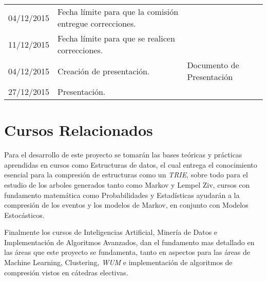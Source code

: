 \documentclass{udparticle}
\begin{document}
\begin{center}
\begin{xtabular}{lp{7cm}p{6cm}}
  		04/12/2015 & Fecha límite para que la comisión entregue correcciones.& \\
  		11/12/2015 & Fecha límite para que se realicen correcciones.& \\
  		
  		04/12/2015 & Creación de presentación.& Documento de Presentación  \\
  		27/12/2015 & Presentación.& \\
  		
  		
  		\hline
  	\end{xtabular}
  \end{center}


\section{Cursos Relacionados}

Para el desarrollo de este proyecto se tomarán las bases teóricas y prácticas aprendidas en cursos como Estructuras de datos, 
el cual entrega el conocimiento esencial  para la compresión de estructuras como un \emph{TRIE}, sobre todo para el estudio de los arboles generados 
tanto como Markov y Lempel Ziv, cursos con fundamento matemática como Probabilidades y Estadísticas ayudarán a la compresión de los eventos
y los modelos de Markov, en conjunto con Modelos Estocásticos. 

Finalmente los cursos de Inteligencias Artificial, Minería de Datos e Implementación de Algoritmos Avanzados, dan el fundamento mas detallado
en las áreas que este proyecto se fundamenta, tanto en aspectos para las áreas de Machine Learning, Clustering, \emph{WUM} e implementación de algoritmos de compresión
vistos en cátedras electivas.



  
% 


 
\end{document}
